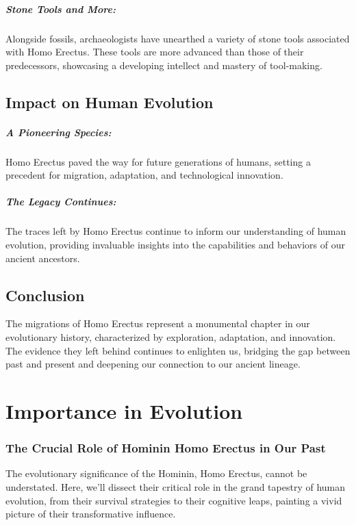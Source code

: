 \documentclass[a4paper,12pt]{book}
\begin{document}
\paragraph{Stone Tools and More:}
Alongside fossils, archaeologists have unearthed a variety of stone tools associated with Homo Erectus. These tools are more advanced than those of their predecessors, showcasing a developing intellect and mastery of tool-making.

\section*{Impact on Human Evolution}

\paragraph{A Pioneering Species:}
Homo Erectus paved the way for future generations of humans, setting a precedent for migration, adaptation, and technological innovation. 

\paragraph{The Legacy Continues:}
The traces left by Homo Erectus continue to inform our understanding of human evolution, providing invaluable insights into the capabilities and behaviors of our ancient ancestors.

\section*{Conclusion}

The migrations of Homo Erectus represent a monumental chapter in our evolutionary history, characterized by exploration, adaptation, and innovation. The evidence they left behind continues to enlighten us, bridging the gap between past and present and deepening our connection to our ancient lineage.

\chapter{Importance in Evolution}
\subsection*{The Crucial Role of Hominin Homo Erectus in Our Past}
The evolutionary significance of the Hominin, Homo Erectus, cannot be understated. Here, we'll dissect their critical role in the grand tapestry of human evolution, from their survival strategies to their cognitive leaps, painting a vivid picture of their transformative influence.
\end{document}
